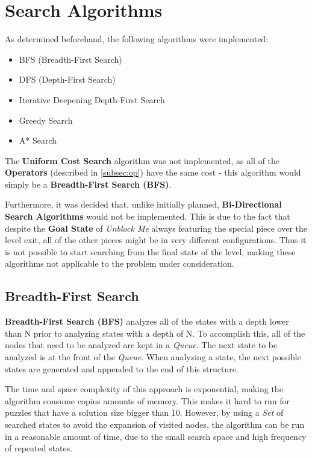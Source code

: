 \documentclass[conference]{IEEEtran}
\begin{document}
\section{Search Algorithms} \label{sec:sa}
As determined beforehand, the following algorithms were implemented:
\begin{itemize}
    \item BFS (Breadth-First Search)
    \item DFS (Depth-First Search)
    \item Iterative Deepening Depth-First Search
    \item Greedy Search
    \item A* Search
\end{itemize}

The \textbf{Uniform Cost Search} algorithm was not implemented, as all of the \textbf{Operators} (described in \autoref{subsec:op}) have the same cost - this algorithm would simply be a \textbf{Breadth-First Search (BFS)}.

Furthermore, it was decided that, unlike initially planned, \textbf{Bi-Directional Search Algorithms} would not be implemented. This is due to the fact that despite the \textbf{Goal State} of \textit{Unblock Me} always featuring the special piece over the level exit, all of the other pieces might be in very different configurations. Thus it is not possible to start searching from the final state of the level, making these algorithms not applicable to the problem under consideration.

\subsection{Breadth-First Search}

\textbf{Breadth-First Search (BFS)} analyzes all of the states with a depth lower than N prior to analyzing states with a depth of N. To accomplish this, all of the nodes that need to be analyzed are kept in a \textit{Queue}. The next state to be analyzed is at the front of the \textit{Queue}. When analyzing a state, the next possible states are generated and appended to the end of this structure.

The time and space complexity of this approach is exponential, making the algorithm consume copius amounts of memory. This makes it hard to run for puzzles that have a solution size bigger than 10. However, by using a \textit{Set} of searched states to avoid the expansion of visited nodes, the algorithm can be run in a reasonable amount of time, due to the small search space and high frequency of repeated states.
\end{document}
